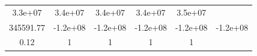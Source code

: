 \documentclass[]{book}
\theoremstyle{definition}
\theoremstyle{definition}
\theoremstyle{definition}
\theoremstyle{remark}
\begin{document}
\begin{longtable}[]{@{}cccccc@{}}
\begin{minipage}[t]{0.13\columnwidth}
3.3e+07\strut
\end{minipage} & \begin{minipage}[t]{0.13\columnwidth}\centering\strut
3.4e+07\strut
\end{minipage} & \begin{minipage}[t]{0.13\columnwidth}\centering\strut
3.4e+07\strut
\end{minipage} & \begin{minipage}[t]{0.13\columnwidth}\centering\strut
3.4e+07\strut
\end{minipage} & \begin{minipage}[t]{0.13\columnwidth}\centering\strut
3.5e+07\strut
\end{minipage}\tabularnewline
\begin{minipage}[t]{0.15\columnwidth}\centering\strut
345591.77\strut
\end{minipage} & \begin{minipage}[t]{0.13\columnwidth}\centering\strut
-1.2e+08\strut
\end{minipage} & \begin{minipage}[t]{0.13\columnwidth}\centering\strut
-1.2e+08\strut
\end{minipage} & \begin{minipage}[t]{0.13\columnwidth}\centering\strut
-1.2e+08\strut
\end{minipage} & \begin{minipage}[t]{0.13\columnwidth}\centering\strut
-1.2e+08\strut
\end{minipage} & \begin{minipage}[t]{0.13\columnwidth}\centering\strut
-1.2e+08\strut
\end{minipage}\tabularnewline
\begin{minipage}[t]{0.15\columnwidth}\centering\strut
0.12\strut
\end{minipage} & \begin{minipage}[t]{0.13\columnwidth}\centering\strut
1\strut
\end{minipage} & \begin{minipage}[t]{0.13\columnwidth}\centering\strut
1\strut
\end{minipage} & \begin{minipage}[t]{0.13\columnwidth}\centering\strut
1\strut
\end{minipage} & \begin{minipage}[t]{0.13\columnwidth}\centering\strut
1\strut
\end{minipage} & \begin{minipage}[t]{0.13\columnwidth}\centering\strut

\end{minipage}
\end{longtable}
\end{document}
